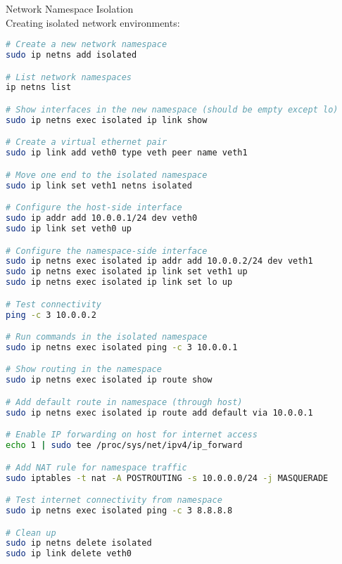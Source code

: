 \begin{example2}{Network Namespace Isolation}\\
    Creating isolated network environments:
    
\begin{lstlisting}[language=bash, style=basesmol]
# Create a new network namespace
sudo ip netns add isolated

# List network namespaces
ip netns list

# Show interfaces in the new namespace (should be empty except lo)
sudo ip netns exec isolated ip link show

# Create a virtual ethernet pair
sudo ip link add veth0 type veth peer name veth1

# Move one end to the isolated namespace
sudo ip link set veth1 netns isolated

# Configure the host-side interface
sudo ip addr add 10.0.0.1/24 dev veth0
sudo ip link set veth0 up

# Configure the namespace-side interface
sudo ip netns exec isolated ip addr add 10.0.0.2/24 dev veth1
sudo ip netns exec isolated ip link set veth1 up
sudo ip netns exec isolated ip link set lo up

# Test connectivity
ping -c 3 10.0.0.2

# Run commands in the isolated namespace
sudo ip netns exec isolated ping -c 3 10.0.0.1

# Show routing in the namespace
sudo ip netns exec isolated ip route show

# Add default route in namespace (through host)
sudo ip netns exec isolated ip route add default via 10.0.0.1

# Enable IP forwarding on host for internet access
echo 1 | sudo tee /proc/sys/net/ipv4/ip_forward

# Add NAT rule for namespace traffic
sudo iptables -t nat -A POSTROUTING -s 10.0.0.0/24 -j MASQUERADE

# Test internet connectivity from namespace
sudo ip netns exec isolated ping -c 3 8.8.8.8

# Clean up
sudo ip netns delete isolated
sudo ip link delete veth0
\end{lstlisting}
\end{example2}

